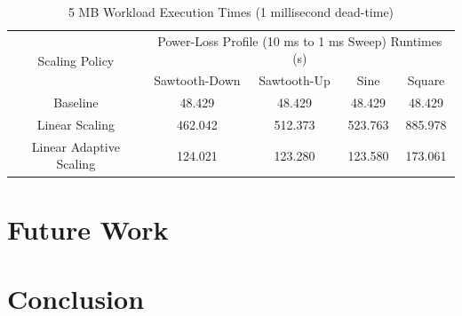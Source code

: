\documentclass[journal, twoside]{IEEEtran}
\begin{document}
\begin{table}
    \renewcommand{\arraystretch}{1.3} %
    \caption{5 MB Workload Execution Times (1 millisecond dead-time)}
    \label{power-loss-profile-performance}
    \centering
    \begin{tabular}{c||c|c|c|c}
        \hline
        \multirow{2}{*}{Scaling Policy} & \multicolumn{4}{c}{Power-Loss Profile (10 ms to 1 ms Sweep) Runtimes (s)} \\\cline{2-5}
        {} & {Sawtooth-Down} & {Sawtooth-Up} & {Sine} & {Square}\\
        \hline
        \hline
        {Baseline}                  &  {48.429} &  {48.429} &  {48.429} &  {48.429}\\
        {Linear Scaling}            & {462.042} & {512.373} & {523.763} & {885.978}\\
        {Linear Adaptive Scaling}   & {124.021} & {123.280} & {123.580} & {173.061}\\
        \hline
    \end{tabular}
\end{table}

\section{Future Work}

\lipsum[4]

\section{Conclusion}

\lipsum[2]



\end{document}
